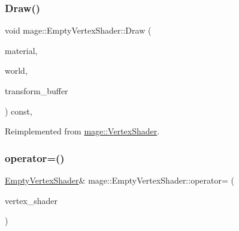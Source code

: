 \subsubsection{\texorpdfstring{Draw()}{Draw()}}
{\footnotesize\ttfamily void mage\+::\+Empty\+Vertex\+Shader\+::\+Draw (\begin{DoxyParamCaption}\item[{const \hyperlink{structmage_1_1_material}{Material} \&}]{material,  }\item[{const \hyperlink{classmage_1_1_world}{World} \&}]{world,  }\item[{const \hyperlink{structmage_1_1_transform_buffer}{Transform\+Buffer} \&}]{transform\+\_\+buffer }\end{DoxyParamCaption}) const\hspace{0.3cm}{\ttfamily [override]}, {\ttfamily [virtual]}}



Reimplemented from \hyperlink{classmage_1_1_vertex_shader_a59a6f805642d81b9e6f491c9d5d95d7b}{mage\+::\+Vertex\+Shader}.

\hypertarget{classmage_1_1_empty_vertex_shader_a2683d29127405d51737008637ebde098}{}\label{classmage_1_1_empty_vertex_shader_a2683d29127405d51737008637ebde098} 
\subsubsection{\texorpdfstring{operator=()}{operator=()}\hspace{0.1cm}{\footnotesize\ttfamily [1/2]}}
{\footnotesize\ttfamily \hyperlink{classmage_1_1_empty_vertex_shader}{Empty\+Vertex\+Shader}\& mage\+::\+Empty\+Vertex\+Shader\+::operator= (\begin{DoxyParamCaption}\item[{const \hyperlink{classmage_1_1_empty_vertex_shader}{Empty\+Vertex\+Shader} \&}]{vertex\+\_\+shader }\end{DoxyParamCaption})\hspace{0.3cm}{\ttfamily [delete]}}

\hypertarget{classmage_1_1_empty_vertex_shader_a449401b726fc5cd30012a3d8df2e0832}{}\label{classmage_1_1_empty_vertex_shader_a449401b726fc5cd30012a3d8df2e0832} 
